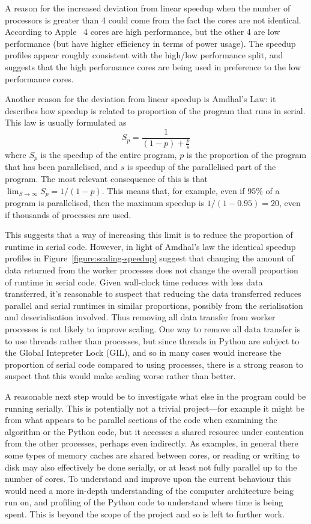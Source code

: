 \documentclass[logo,msc,dsti]{style/infthesis}    %
\begin{document}
{A reason for the increased deviation from linear speedup when the number of processors is greater than 4 could come from the fact the cores are not identical. According to Apple~\cite{AppleM1Overview} 4 cores are high performance, but the other 4 are low performance (but have higher efficiency in terms of power usage). The speedup profiles appear roughly consistent with the high/low performance split, and suggests that the high performance cores are being used in preference to the low performance cores.

Another reason for the deviation from linear speedup is Amdhal's Law: it describes how speedup is related to proportion of the program that runs in serial. This law is usually formulated as
%
\begin{equation*}
S_p = \frac{1}{(1-p) + \frac{p}{s}}
\end{equation*}
%
where $S_p$ is the speedup of the entire program, $p$ is the proportion of the program that has been parallelised, and $s$ is speedup of the parallelised part of the program. The most relevant consequence of this is that $\lim_{S\to\infty} S_p = 1/\left(1-p\right)$. This means that, for example, even if 95\% of a program is parallelised, then the maximum speedup is $1 / \left(1-0.95\right)=20$, even if thousands of processes are used.

This suggests that a way of increasing this limit is to reduce the proportion of runtime in serial code. However, in light of Amdhal's law the identical speedup profiles in Figure~\ref{figure:scaling-speedup} suggest that changing the amount of data returned from the worker processes does not change the overall proportion of runtime in serial code. Given wall-clock time reduces with less data transferred, it's reasonable to suspect that reducing the data transferred reduces parallel and serial runtimes in similar proportions, possibly from the serialisation and deserialisation involved. Thus removing all data transfer from worker processes is not likely to improve scaling. One way to remove all data transfer is to use threads rather than processes, but since threads in Python are subject to the Global Intepreter Lock (GIL), and so in many cases would increase the proportion of serial code compared to using processes, there is a strong reason to suspect that this would make scaling worse rather than better.

A reasonable next step would be to investigate what else in the program could be running serially. This is potentially not a trivial project---for example it might be from what appears to be parallel sections of the code when examining the algorithm or the Python code, but it accesses a shared resource under contention from the other processes, perhaps even indirectly. As examples, in general there some types of memory caches are shared between cores, or reading or writing to disk  may also effectively be done serially, or at least not fully parallel up to the number of cores. To understand and improve upon the current behaviour this would need a more in-depth understanding of the computer architecture being run on, and profiling of the Python code to understand where time is being spent. This is beyond the scope of the project and so is left to further work.

}
\end{document}
